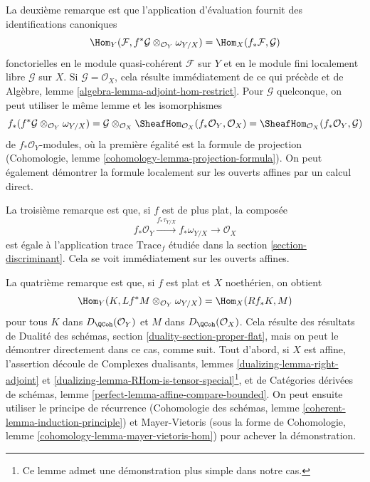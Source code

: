 \medskip\noindent
La deuxième remarque est que l'application d'évaluation fournit
des identifications canoniques
$$
\Hom_Y(\mathcal{F}, f^*\mathcal{G} \otimes_{\mathcal{O}_Y} \omega_{Y/X})
=
\Hom_X(f_*\mathcal{F}, \mathcal{G})
$$
fonctorielles en le module quasi-cohérent $\mathcal{F}$ sur $Y$
et en le module fini localement libre $\mathcal{G}$ sur $X$.
Si $\mathcal{G} = \mathcal{O}_X$, cela résulte immédiatement
de ce qui précède et de
Algèbre, lemme \ref{algebra-lemma-adjoint-hom-restrict}.
Pour $\mathcal{G}$ quelconque, on peut utiliser le même lemme et les
isomorphismes
$$
f_*(f^*\mathcal{G} \otimes_{\mathcal{O}_Y} \omega_{Y/X}) =
\mathcal{G} \otimes_{\mathcal{O}_X}
\SheafHom_{\mathcal{O}_X}(f_*\mathcal{O}_Y, \mathcal{O}_X) =
\SheafHom_{\mathcal{O}_X}(f_*\mathcal{O}_Y, \mathcal{G})
$$
de $f_*\mathcal{O}_Y$-modules, où la première égalité est la
formule de projection
(Cohomologie, lemme \ref{cohomology-lemma-projection-formula}).
On peut également démontrer la formule localement sur les ouverts affines par
un calcul direct.

\medskip\noindent
La troisième remarque est que, si $f$ est de plus plat, la
composée
$$
f_*\mathcal{O}_Y \xrightarrow{f_*\tau_{Y/X}} f_*\omega_{Y/X}
\longrightarrow \mathcal{O}_X
$$
est égale à l'application trace $\text{Trace}_f$ étudiée dans la
section \ref{section-discriminant}. Cela se voit immédiatement
sur les ouverts affines.

\medskip\noindent
La quatrième remarque est que, si $f$ est plat et $X$ noethérien, on
obtient
$$
\Hom_Y(K, Lf^*M \otimes_{\mathcal{O}_Y} \omega_{Y/X})
=
\Hom_X(Rf_*K, M)
$$
pour tous $K$ dans $D_\QCoh(\mathcal{O}_Y)$ et $M$ dans $D_\QCoh(\mathcal{O}_X)$.
Cela résulte des résultats de
Dualité des schémas, section \ref{duality-section-proper-flat},
mais on peut le démontrer directement dans ce cas, comme suit.
Tout d'abord, si $X$ est affine, l'assertion découle de
Complexes dualisants, lemmes \ref{dualizing-lemma-right-adjoint} et
\ref{dualizing-lemma-RHom-is-tensor-special}\footnote{Ce lemme admet
une démonstration plus simple dans notre cas.}, et de
Catégories dérivées de schémas, lemme \ref{perfect-lemma-affine-compare-bounded}.
On peut ensuite utiliser le principe de récurrence
(Cohomologie des schémas, lemme \ref{coherent-lemma-induction-principle})
et Mayer-Vietoris
(sous la forme de Cohomologie, lemme \ref{cohomology-lemma-mayer-vietoris-hom})
pour achever la démonstration.







